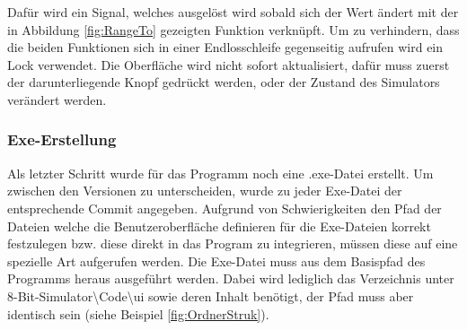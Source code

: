 \documentclass[12pt]{article}
\newcommand{\imgSpaceBefore}{\vspace{10pt}}
\begin{document}
\noindent
Dafür wird ein Signal, welches ausgelöst wird sobald sich der Wert ändert mit der in Abbildung \ref{fig:RangeTo} gezeigten Funktion verknüpft. Um zu verhindern, dass die beiden Funktionen sich in einer Endlosschleife gegenseitig aufrufen wird ein Lock verwendet. Die Oberfläche wird nicht sofort aktualisiert, dafür muss zuerst der darunterliegende Knopf gedrückt werden, oder der Zustand des Simulators verändert werden.

\subsubsection{Exe-Erstellung}
Als letzter Schritt wurde für das Programm noch eine .exe-Datei erstellt. Um zwischen den Versionen zu unterscheiden, wurde zu jeder Exe-Datei der entsprechende Commit angegeben. Aufgrund von Schwierigkeiten den Pfad der Dateien welche die Benutzeroberfläche definieren für die Exe-Dateien korrekt festzulegen bzw. diese direkt in das Program zu integrieren, müssen diese auf eine spezielle Art aufgerufen werden. Die Exe-Datei muss aus dem Basispfad des Programms heraus ausgeführt werden. Dabei wird lediglich das Verzeichnis unter 8-Bit-Simulator\textbackslash Code\textbackslash ui sowie deren Inhalt benötigt, der Pfad muss aber identisch sein (siehe Beispiel \ref{fig:OrdnerStruk}).\imgSpaceBefore
\end{document}
